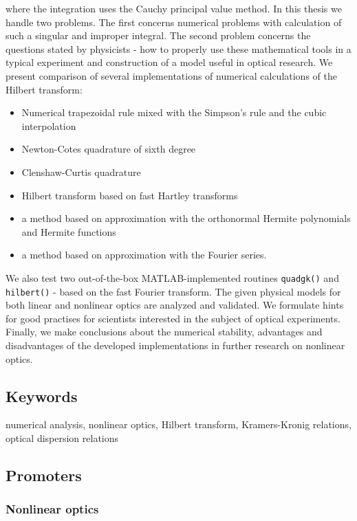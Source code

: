 \documentclass[12pt,twoside,a4paper]{article}
\def\emptyline{\vspace{12pt}}
\numberwithin{equation}{subsection}
\numberwithin{figure}{subsection}
\begin{document}
where the integration uses the Cauchy principal value method. In this thesis we handle two problems. The first concerns numerical
problems with calculation of such a singular and improper integral. The second problem concerns the questions stated by physicists
- how to properly use these mathematical tools in a typical experiment and construction of a model useful in optical research. We
present comparison of several implementations of numerical calculations of the Hilbert transform:

\begin{itemize} \label{used_methods}
 \item Numerical trapezoidal rule mixed with the Simpson's rule and the
cubic interpolation
 \item Newton-Cotes quadrature of sixth degree
 \item Clenshaw-Curtis quadrature
 \item Hilbert transform based on fast Hartley transforms
 \item a method based on approximation with the orthonormal Hermite polynomials and Hermite functions
 \item a method based on approximation with the Fourier series.
\end{itemize}

We also test two out-of-the-box MATLAB-implemented routines \texttt{quadgk()} and \texttt{hilbert()} - based on the fast Fourier
transform. The given physical models for both linear and nonlinear optics are analyzed and validated. We formulate hints for good
practises for scientists interested in the subject of optical experiments. Finally, we make conclusions about the numerical stability, advantages
and disadvantages of the developed implementations in further research on nonlinear optics.

\emptyline

\subsection*{Keywords} \label{chap:abstract_keywords}
numerical analysis, nonlinear optics, Hilbert transform, Kramers-Kronig relations, optical dispersion relations

\subsection*{Promoters} \label{chap:abstract_promotors}

\subsubsection*{Nonlinear optics}
\end{document}
